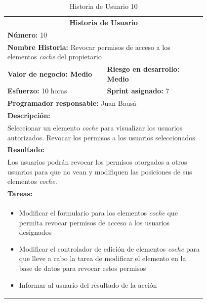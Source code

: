 	\begin{table}[H]
	  \centering 
	 	\begin{tabular}{p{0.4\linewidth}p{0.4\linewidth}}
	    \toprule
	    \multicolumn{2}{c}{\cellcolor{black!30}\textbf{Historia de Usuario}} 													\\
		\multicolumn{2}{l}{\cellcolor{gray!25}\textbf{Número: }10}																\\
		\multicolumn{2}{l}{\textbf{Nombre Historia: } Revocar permisos de acceso a los elementos \textit{coche} del propietario}						\\
		\cellcolor{gray!25}\textbf{Valor de negocio: Medio}	&	\cellcolor{gray!25}\textbf{Riesgo en desarrollo: Medio}	\\
		\textbf{Esfuerzo:} 10 horas				&	\textbf{Sprint asignado: }7 												\\
		\multicolumn{2}{l}{\cellcolor{gray!25}\textbf{Programador responsable: }Juan Bausá}									\\
		\multicolumn{2}{l}{\textbf{Descripción:}}                                                     						\\
		\multicolumn{2}{l}{\parbox{15cm}{Seleccionar un elemento \textit{coche} para visualizar los usuarios autorizados. Revocar los permisos a los usuarios seleccionados }}				\\
		\multicolumn{2}{l}{\cellcolor{gray!25}\textbf{Resultado:}}																\\		
		\multicolumn{2}{l}{\parbox{15cm}{Los usuarios podrán revocar los permisos otorgados a otros usuarios para que no vean y modifiquen las posiciones de sus elementos \textit{coche.}}}																								\\
		\multicolumn{2}{l}{\textbf{Tareas:}}																					\\
		\multicolumn{2}{l}{
			\begin{minipage}{12cm}
	    		\vskip 4pt
	    		\begin{itemize}
	    			\item Modificar el formulario para los elementos \textit{coche} que permita revocar permisos de acceso a los usuarios designados
	    			\item Modificar el controlador de edición de elementos \textit{coche} para que lleve a cabo la tarea de modificar el elemento en la base de datos para revocar estos permisos
	    			\item Informar al usuario del resultado de la acción
				\end{itemize}
			  	\vskip 4pt
		 	\end{minipage}
		} \\																				
	    \hline
	  \end{tabular}
	  \caption{Historia de Usuario 10}
	\end{table}
	

